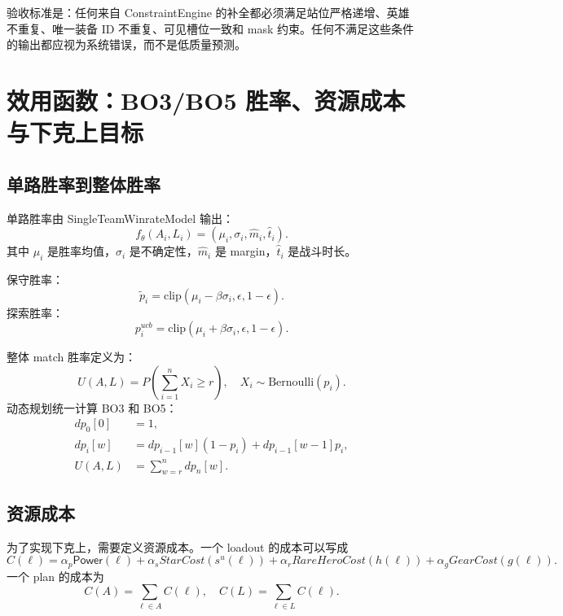 \documentclass[UTF8,12pt,openany]{ctexbook}
\newcommand{\Power}{\mathsf{Power}}
\begin{document}
验收标准是：任何来自 ConstraintEngine 的补全都必须满足站位严格递增、英雄不重复、唯一装备 ID 不重复、可见槽位一致和 mask 约束。任何不满足这些条件的输出都应视为系统错误，而不是低质量预测。


\chapter{效用函数：BO3/BO5 胜率、资源成本与下克上目标}

\section{单路胜率到整体胜率}
单路胜率由 SingleTeamWinrateModel 输出：
\begin{equation}
f_\theta(A_i,L_i)=(\mu_i,\sigma_i,\hat m_i,\hat t_i).
\end{equation}
其中 $\mu_i$ 是胜率均值，$\sigma_i$ 是不确定性，$\hat m_i$ 是 margin，$\hat t_i$ 是战斗时长。

保守胜率：
\begin{equation}
\tilde p_i=\mathrm{clip}(\mu_i-\beta\sigma_i,\epsilon,1-\epsilon).
\end{equation}
探索胜率：
\begin{equation}
p_i^{ucb}=\mathrm{clip}(\mu_i+\beta\sigma_i,\epsilon,1-\epsilon).
\end{equation}

整体 match 胜率定义为：
\begin{equation}
U(A,L)=P\left(\sum_{i=1}^{n}X_i\ge r\right),\quad X_i\sim\mathrm{Bernoulli}(p_i).
\end{equation}
动态规划统一计算 BO3 和 BO5：
\begin{align}
dp_0[0]&=1,\\
dp_i[w]&=dp_{i-1}[w](1-p_i)+dp_{i-1}[w-1]p_i,\\
U(A,L)&=\sum_{w=r}^{n}dp_n[w].
\end{align}

\section{资源成本}
为了实现下克上，需要定义资源成本。一个 loadout 的成本可以写成
\begin{equation}
C(\ell)=\alpha_p\Power(\ell)+\alpha_s StarCost(s^u(\ell))+\alpha_r RareHeroCost(h(\ell))+\alpha_g GearCost(g(\ell)).
\end{equation}
一个 plan 的成本为
\begin{equation}
C(A)=\sum_{\ell\in A}C(\ell),\quad C(L)=\sum_{\ell\in L}C(\ell).
\end{equation}
\end{document}

